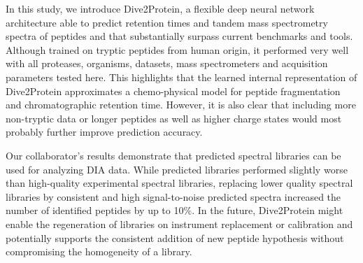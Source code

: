 In this study, we introduce Dive2Protein, a flexible deep neural network architecture able to predict retention times and
tandem mass spectrometry spectra of peptides and that substantially surpass current
benchmarks and tools. Although trained on tryptic peptides from human origin, it performed very well with all proteases,
organisms, datasets, mass spectrometers and acquisition parameters tested here. This highlights that the learned internal
representation of Dive2Protein approximates a chemo-physical model for peptide fragmentation and chromatographic retention time.
However, it is also clear that including more non-tryptic data or longer peptides as well as higher charge states would
most probably further improve prediction accuracy.

Our collaborator's results demonstrate that predicted spectral libraries can be used for analyzing DIA data. While predicted
libraries performed slightly worse than high-quality experimental spectral libraries, replacing lower quality
spectral libraries by consistent and high signal-to-noise predicted spectra increased the number of identified
peptides by up to 10$\%$. In the future, Dive2Protein might enable the regeneration of libraries on instrument replacement
or calibration and potentially supports the consistent addition of new peptide hypothesis without compromising
the homogeneity of a library.